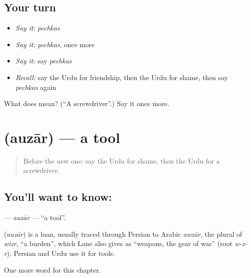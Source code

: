 \subsection*{Your turn}
\begin{itemize}
\raggedright
  \item \emph{Say it:} \emph{pechkas}
  \item \emph{Say it:} \emph{pechkas}, once more
  \item \emph{Say it:} say \emph{pechkas}
  \item \emph{Recall:} say the Urdu for friendship, then the Urdu for shame, then say \emph{pechkas} again
\end{itemize}

\begin{tcolorbox}[breakable,colback=teal!4,colframe=teal!35!black,title={Before you move on}]
What does   mean? (\textquotedblleft{}A screwdriver\textquotedblright{}.) Say it once more.
\end{tcolorbox}
\section[\texorpdfstring{\ur{اوزار} (auzār)}{اوزار (auzār)}]{ (auzār) — a tool}

\label{lesson:UR-C258-auzar}



\begin{quote}
Before the new one: say the Urdu for shame, then the Urdu for a screwdriver.
\end{quote}

\subsection*{You'll want to know: }
\textbf{} — \emph{auzār} — \textquotedblleft{}a tool\textquotedblright{}.

\begin{cousinweb}
\textbf{} (\emph{auzār}) is a loan, usually traced through Persian to Arabic \emph{awzār}, the plural of \emph{wizr}, \textquotedblleft{}a burden\textquotedblright{}, which Lane also gives as \textquotedblleft{}weapons, the gear of war\textquotedblright{} (root \emph{w-z-r}). Persian and Urdu use it for tools.
\end{cousinweb}

\begin{grammarlens}[title={What you've built}]
One more word for this chapter.
\end{grammarlens}

